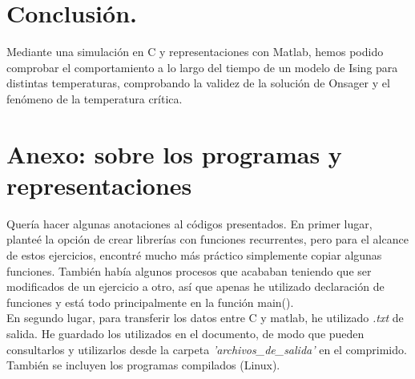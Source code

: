 \documentclass[a4paper,12pt,spanish]{article}
\begin{document}
\section{Conclusión.}

Mediante una simulación en C y representaciones con Matlab, hemos podido comprobar el comportamiento a lo largo del tiempo de un modelo de Ising para distintas temperaturas, comprobando la validez de la solución de Onsager y el fenómeno de la temperatura crítica.


\section*{Anexo: sobre los programas y representaciones}

Quería hacer algunas anotaciones al códigos presentados. En primer lugar, planteé la opción de crear librerías con funciones recurrentes, pero para el alcance de estos ejercicios, encontré mucho más práctico simplemente copiar algunas funciones. También había algunos procesos que acababan teniendo que ser modificados de un ejercicio a otro, así que apenas he utilizado declaración de funciones y está todo principalmente en la función main().\\

En segundo lugar, para transferir los datos entre C y matlab, he utilizado \textit{.txt} de salida. He guardado los utilizados en el documento, de modo que pueden consultarlos y utilizarlos desde la carpeta \textit{'archivos\_de\_salida'} en el comprimido. También se incluyen los programas compilados (Linux).

	
\end{document}

